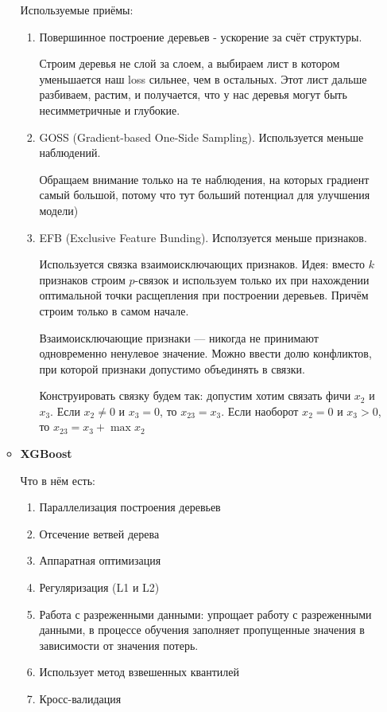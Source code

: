 \documentclass[a4paper]{article}
\begin{document}
\begin{itemize}
\begin{itemize}
Используемые приёмы:
\begin{enumerate}
\item Повершинное построение деревьев - ускорение за счёт структуры.

Строим деревья не слой за слоем, а выбираем лист в котором уменьшается наш loss сильнее, чем в остальных. Этот лист дальше разбиваем, растим, и получается, что у нас деревья могут быть несимметричные и глубокие.

\item GOSS (Gradient-based One-Side Sampling). Используется меньше наблюдений.

Обращаем внимание только на те наблюдения, на которых градиент самый большой, потому что тут больший потенциал для улучшения модели)
\item EFB (Exclusive Feature Bunding). Исползуется меньше признаков.

Используется связка взаимоисключающих признаков. Идея: вместо $k$ признаков строим $p$-связок и используем только их при нахождении оптимальной точки расщепления при построении деревьев.
Причём строим только в самом начале.

Взаимоисключающие признаки — никогда не принимают одновременно ненулевое значение. Можно ввести долю конфликтов, при которой признаки допустимо объединять в связки.

Конструировать связку будем так:
допустим хотим связать фичи $x_2$ и $x_3$.
Если $x_2 \neq 0$ и $x_3  = 0$, то $x_{23} = x_3$. Если наоборот $x_2 = 0$ и $x_3 > 0$, то $x_{23} = x_3 + \max x_2$
\end{enumerate}

\item \textbf{XGBoost}

Что в нём есть:

\begin{enumerate}

\item Параллелизация построения деревьев
\item Отсечение ветвей дерева
\item Аппаратная оптимизация
\item Регуляризация (L1 и L2)
\item Работа с разреженными данными: упрощает работу с разреженными данными, в процессе обучения заполняет пропущенные значения в зависимости от значения потерь. 
\item Использует метод взвешенных квантилей
\item Кросс-валидация
\end{enumerate}

\end{itemize}

\end{itemize}
\end{document}
